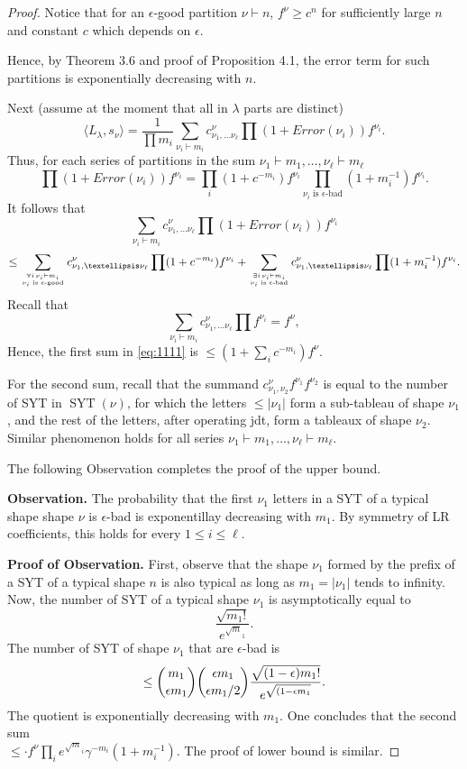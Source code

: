 \documentclass[10pt,a4paper]{amsart}
\newcommand{\SYT}{{\operatorname{SYT}}}
\newcommand{\la}{{\lambda}}
\begin{document}
\begin{proof}
{Notice that for an $\epsilon$-good partition $\nu\vdash n$,  $f^\nu \ge c^n$ for sufficiently large $n$ and constant $c$ which depends on $\epsilon$. 

Hence, by Theorem 3.6 and proof of Proposition 4.1, the error term for such partitions is exponentially decreasing with $n$. 

Next (assume at the moment that all in $\lambda$ parts are distinct)
\[
\langle L_{\la},s_\nu\rangle=\frac{1}{\prod m_i}
\sum_{\nu_i\vdash m_i}c^\nu_{\nu_1,\ldots\nu_\ell}\prod \left(1+Error(\nu_i)\right)f^{\nu_i}.
\]
Thus, for each series of partitions in the sum $\nu_1\vdash m_1,\dots,\nu_\ell\vdash m_\ell$
\[
\prod \left(1+Error(\nu_i)\right)f^{\nu_i}=\prod_i \left(1+c^{-m_i}\right)f^{\nu_i} \prod_{\nu_i\text{ is $\epsilon$-bad}} \left(1+m_i^{-1}\right)f^{\nu_i}.  
\]
It follows that 
\[
\sum_{\nu_i\vdash m_i}c^\nu_{\nu_1,\ldots\nu_\ell}\prod \left(1+Error(\nu_i)\right)f^{\nu_i}
\]
\begin{equation}\label{eq:1111}
\le\sum_{\forall i\, \nu_i\vdash m_i\atop \nu_i \text{ is $\epsilon$-good}}c^\nu_{\nu_1,\ldots\nu_\ell}\prod (1+c^{-m_i}) f^{\nu_i} + \sum_{\exists i\, \nu_i\vdash m_i\atop \nu_i\text{ is $\epsilon$-bad} 
}c^\nu_{\nu_1,\ldots\nu_\ell}\prod (1+m_i^{-1}) f^{\nu_i}. 
\end{equation}
Recall that
\[
\sum_{\nu_i\vdash m_i}c^\nu_{\nu_1,\ldots\nu_\ell}\prod f^{\nu_i}=f^\nu,
\]
Hence, the first sum in \eqref{eq:1111} is  $\le (1+\sum_i c^{- m_i})f^\nu$. 

For the second sum, recall that the summand $c^\nu_{\nu_1,\nu_2} f^{\nu_1}f^{\nu_2}$ is equal to the number of SYT in $\SYT(\nu)$, for which the letters $\le |\nu_1|$ form a sub-tableau of shape $\nu_1$, and the rest of the letters, after operating jdt, form a tableaux of shape $\nu_2$.
Similar phenomenon holds for all series $\nu_1\vdash m_1,\dots,\nu_\ell\vdash m_\ell$. 




The following Observation completes the proof of the upper bound. 

{\bf Observation.} The probability  that the first $\nu_1$ letters in a  SYT of a typical shape shape $\nu$ is  $\epsilon$-bad is exponentillay decreasing with $m_1$.   
By symmetry of LR coefficients, this holds for every $1\le i\le \ell$. 

{\bf Proof of Observation.} First, observe that the shape $\nu_1$ formed by the prefix of 
a SYT of a typical shape $n$ is also typical as long as $m_1=|\nu_1|$ tends to infinity. Now, 
the number of SYT of a typical shape $\nu_1$ is asymptotically  
equal to 
\[
\frac{\sqrt {m_1!}}{e^{\sqrt m_1}}.
\]
The number of SYT of shape $\nu_1$ that are $\epsilon$-bad is 
\[
\le \binom{m_1}{\epsilon m_1} \binom{\epsilon m_1}{\epsilon m_1/2} {\sqrt {(1-\epsilon)m_1!}\over e^{\sqrt{(1-\epsilon m_1}} }. 
\]
The quotient is exponentially decreasing with $m_1$. One concludes that the second sum\\ $\le  \cdot f^\nu \prod\limits_i e^{\sqrt m_i}\gamma^{-m_i}(1+m_i^{-1})$. The proof of lower bound is similar. 
}

\end{proof}
\end{document}
